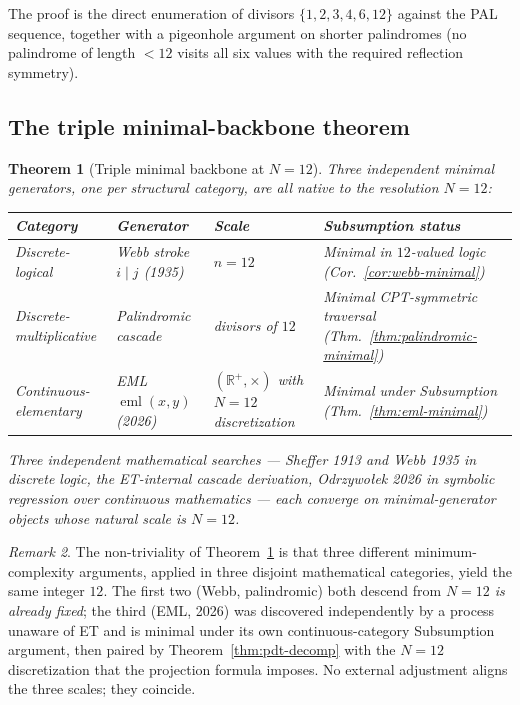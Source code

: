 \documentclass[11pt,a4paper]{article}
\newtheorem{theorem}{Theorem}[section]
\theoremstyle{definition}
\theoremstyle{remark}
\newtheorem{remark}[theorem]{Remark}
\newcommand{\R}{\mathbb{R}}
\begin{document}
The proof is the direct enumeration of divisors $\{1,2,3,4,6,12\}$ against the PAL sequence, together with a pigeonhole argument on shorter palindromes (no palindrome of length $<12$ visits all six values with the required reflection symmetry).

\subsection{The triple minimal-backbone theorem}\label{subsec:triple-backbone}

\begin{theorem}[Triple minimal backbone at $N=12$]\label{thm:triple-backbone}
Three independent minimal generators, one per structural category, are all native to the resolution $N=12$:
\begin{center}
\begin{tabularx}{\textwidth}{@{}lXlX@{}}
\toprule
Category & Generator & Scale & Subsumption status\\
\midrule
Discrete-logical & Webb stroke $i\mathbin{|}j$ (1935) & $n=12$ & Minimal in $12$-valued logic (Cor.~\ref{cor:webb-minimal})\\
Discrete-multiplicative & Palindromic cascade & divisors of $12$ & Minimal CPT-symmetric traversal (Thm.~\ref{thm:palindromic-minimal})\\
Continuous-elementary & EML $\operatorname{eml}(x,y)$ (2026) & $(\R^{+},\times)$ with $N=12$ discretization & Minimal under Subsumption (Thm.~\ref{thm:eml-minimal})\\
\bottomrule
\end{tabularx}
\end{center}
Three independent mathematical searches --- Sheffer 1913 and Webb 1935 in discrete logic, the ET-internal cascade derivation, Odrzywołek 2026 in symbolic regression over continuous mathematics --- each converge on minimal-generator objects whose natural scale is $N=12$.
\end{theorem}

\begin{remark}
The non-triviality of Theorem~\ref{thm:triple-backbone} is that three different minimum-complexity arguments, applied in three disjoint mathematical categories, yield the same integer $12$. The first two (Webb, palindromic) both descend from \emph{$N=12$ is already fixed}; the third (EML, 2026) was discovered independently by a process unaware of ET and is minimal under its own continuous-category Subsumption argument, then paired by Theorem~\ref{thm:pdt-decomp} with the $N=12$ discretization that the projection formula imposes. No external adjustment aligns the three scales; they coincide.
\end{remark}
\end{document}
